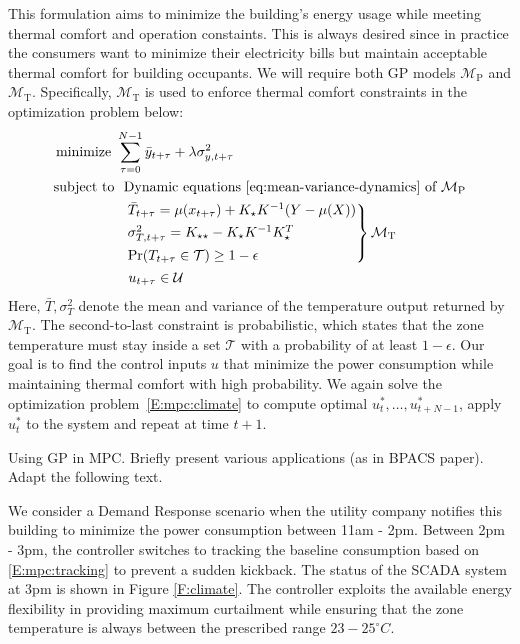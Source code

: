 This formulation aims to minimize the building's energy usage while meeting thermal comfort and operation constaints. 
This is always desired since in practice the consumers want to minimize their electricity bills but maintain acceptable thermal comfort for building occupants.
We will require both GP models \(\mathcal{M}_{\mathrm{P}}\) and \(\mathcal{M}_{\mathrm{T}}\).
Specifically, \(\mathcal{M}_{\mathrm{T}}\) is used to enforce thermal comfort constraints in the optimization problem below:
\begin{align}
&\operatorname*{minimize} \ \sum_{\tau=0}^{N-1} \bar{y}_{t+\tau} + \lambda \sigma^2_{y,t+\tau} \label{E:mpc:climate} \\
& 
\begin{aligned}
  \text{subject to}\ \  & \text{Dynamic equations \eqref{eq:mean-variance-dynamics} of $\mathcal{M}_{\mathrm{P}}$} \\
  & \begin{rcases}
    \bar{T}_{t+\tau} = \mu(x_{t+\tau}) + K_\star K^{-1} (Y - \mu(X)) \nonumber\\
    \sigma^2_{T,t+\tau} = K_{\star \star} - K_\star K^{-1} K_\star^T \\
    \Pr(T_{t+\tau} \in \mathcal{T}) \geq 1 - \epsilon \nonumber
  \end{rcases} \mathcal{M}_{\mathrm{T}} \\
  & \ u_{t+\tau} \in \mathcal{U} \nonumber
\end{aligned}
\end{align}
Here, \(\bar{T},\sigma^2_{T}\) denote the mean and variance of the temperature output returned by \(\mathcal{M}_{\mathrm{T}}\). 
The second-to-last constraint is probabilistic, which states that the zone temperature must stay inside a set $\mathcal{T}$ with a probability of at least $1 - \epsilon$.
Our goal is to find the control inputs \(u\) that minimize the power consumption while maintaining thermal comfort with high probability. 
We again solve the optimization problem~\eqref{E:mpc:climate} to compute optimal \(u_{t}^*, \dots, u_{t+N-1}^*\), apply \(u_{t}^*\) to the system and repeat at time \(t+1\).

\begin{todo}
  Using GP in MPC. Briefly present various applications (as in BPACS paper).
  Adapt the following text.
\end{todo}
We consider a Demand Response scenario when the utility company notifies this building to minimize the power consumption between 11am - 2pm.
Between 2pm - 3pm, the controller switches to tracking the baseline consumption based on \eqref{E:mpc:tracking} to prevent a sudden kickback.
The status of the SCADA system at 3pm is shown in Figure \ref{F:climate}.
The controller exploits the available energy flexibility in providing maximum curtailment while ensuring that the zone temperature is always between the prescribed range \(23-25^\circ C\).


